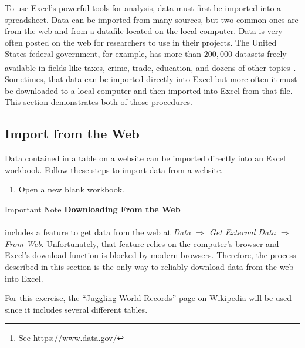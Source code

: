 To use Excel's powerful tools for analysis, data must first be imported into a spreadsheet. Data can be imported from many sources, but two common ones are from the web and from a datafile located on the local computer. Data is very often posted on the web for researchers to use in their projects. The United States federal government, for example, has more than $ 200,000 $ datasets freely available in fields like taxes, crime, trade, education, and dozens of other topics\footnote{See \url{https://www.data.gov/}}. Sometimes, that data can be imported directly into Excel but more often it must be downloaded to a local computer and then imported into Excel from that file. This section demonstrates both of those procedures.

\subsection{Import from the Web}

Data contained in a table on a website can be imported directly into an Excel workbook. Follow these steps to import data from a website.

\begin{enumbox}
	\begin{enumerate}
		\item Open a new blank workbook.
	\end{enumerate}
\end{enumbox}
	
\begin{center}
	\begin{infobox}{Important Note}
		\textbf{Downloading From the Web}
		\\
		\\
		 includes a feature to get data from the web at \textit{Data $ \Rightarrow $ Get External Data $ \Rightarrow $ From Web}. Unfortunately, that feature relies on the computer's browser and Excel's download function is blocked by modern browsers. Therefore, the process described in this section is the only way to reliably download data from the web into Excel.
	\end{infobox}
\end{center}

For this exercise, the ``Juggling World Records'' page on Wikipedia will be used since it includes several different tables.

